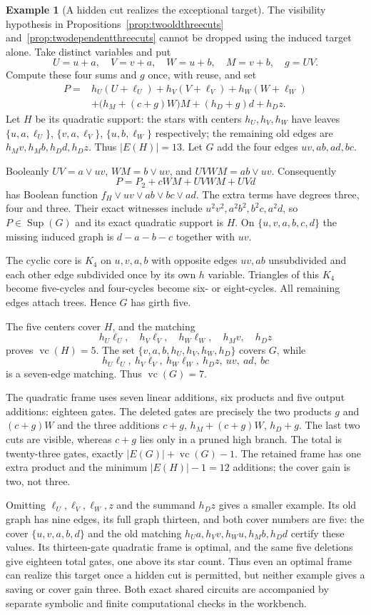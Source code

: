 \documentclass[11pt]{article}
\newcommand{\Sup}{\operatorname{Sup}}
\newcommand{\vc}{\operatorname{vc}}
\theoremstyle{definition}
\newtheorem{example}[theorem]{Example}
\theoremstyle{remark}
\begin{document}
\begin{example}[A hidden cut realizes the exceptional target]\label{ex:hiddencutscope}
The visibility hypothesis in Propositions~\ref{prop:twooldthreecuts} and~\ref{prop:twodependentthreecuts} cannot be dropped using the induced target alone. Take distinct variables and put
\[
 U=u+a,\quad V=v+a,\quad W=u+b,\quad M=v+b,\quad g=UV.
\]
Compute these four sums and $g$ once, with reuse, and set
\[
 \begin{split}
 P={}&h_U(U+\ell_U)+h_V(V+\ell_V)+h_W(W+\ell_W)\\
    &+\bigl(h_M+(c+g)W\bigr)M+(h_D+g)d+h_Dz.
 \end{split}
\]
Let $H$ be its quadratic support: the stars with centers $h_U,h_V,h_W$ have leaves $\{u,a,\ell_U\}$, $\{v,a,\ell_V\}$, $\{u,b,\ell_W\}$ respectively; the remaining old edges are $h_Mv,h_Mb,h_Dd,h_Dz$. Thus $|E(H)|=13$. Let $G$ add the four edges $uv,ab,ad,bc$.

Booleanly $UV=a\vee uv$, $WM=b\vee uv$, and $UVWM=ab\vee uv$. Consequently
\[
 P=P_2+cWM+UVWM+UVd
\]
has Boolean function $f_H\vee uv\vee ab\vee bc\vee ad$. The extra terms have degrees three, four and three. Their exact witnesses include $u^2v^2,a^2b^2,b^2c,a^2d$, so $P\in\Sup(G)$ and its exact quadratic support is $H$. On $\{u,v,a,b,c,d\}$ the missing induced graph is $d-a-b-c$ together with $uv$.

The cyclic core is $K_4$ on $u,v,a,b$ with opposite edges $uv,ab$ unsubdivided and each other edge subdivided once by its own $h$ variable. Triangles of this $K_4$ become five-cycles and four-cycles become six- or eight-cycles. All remaining edges attach trees. Hence $G$ has girth five.

The five centers cover $H$, and the matching
\[
 h_U\ell_U,\quad h_V\ell_V,\quad h_W\ell_W,
 \quad h_Mv,\quad h_Dz
\]
proves $\vc(H)=5$. The set $\{v,a,b,h_U,h_V,h_W,h_D\}$ covers $G$, while
\[
 h_U\ell_U,\ h_V\ell_V,\ h_W\ell_W,\ h_Dz,
 \ uv,\ ad,\ bc
\]
is a seven-edge matching. Thus $\vc(G)=7$.

The quadratic frame uses seven linear additions, six products and five output additions: eighteen gates. The deleted gates are precisely the two products $g$ and $(c+g)W$ and the three additions $c+g$, $h_M+(c+g)W$, $h_D+g$. The last two cuts are visible, whereas $c+g$ lies only in a pruned high branch. The total is twenty-three gates, exactly $|E(G)|+\vc(G)-1$. The retained frame has one extra product and the minimum $|E(H)|-1=12$ additions; the cover gain is two, not three.

Omitting $\ell_U,\ell_V,\ell_W,z$ and the summand $h_Dz$ gives a smaller example. Its old graph has nine edges, its full graph thirteen, and both cover numbers are five: the cover $\{u,v,a,b,d\}$ and the old matching $h_Ua,h_Vv,h_Wu,h_Mb,h_Dd$ certify these values. Its thirteen-gate quadratic frame is optimal, and the same five deletions give eighteen total gates, one above its star count. Thus even an optimal frame can realize this target once a hidden cut is permitted, but neither example gives a saving or cover gain three. Both exact shared circuits are accompanied by separate symbolic and finite computational checks in the workbench.
\end{example}
\end{document}
